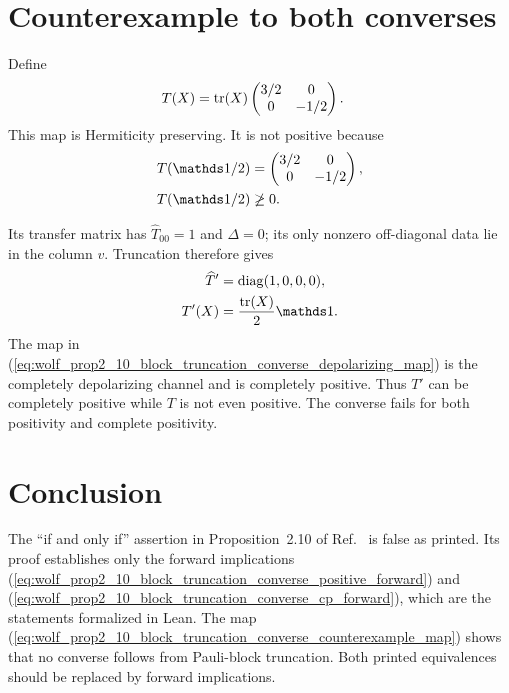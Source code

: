 \documentclass{article}
\begin{document}
\section{Counterexample to both converses}

Define
\begin{align}
    T(X)
        &=\operatorname{tr}(X)
          \begin{pmatrix}
              3/2 & 0\\
              0 & -1/2
          \end{pmatrix}.
    \label{eq:wolf_prop2_10_block_truncation_converse_counterexample_map}
\end{align}
This map is Hermiticity preserving. It is not positive because
\begin{align}
    T(\Id/2)
        &=
          \begin{pmatrix}
              3/2 & 0\\
              0 & -1/2
          \end{pmatrix},
    \label{eq:wolf_prop2_10_block_truncation_converse_negative_output}\\
    T(\Id/2)
        &\not\geq0.
    \label{eq:wolf_prop2_10_block_truncation_converse_not_positive}
\end{align}

Its transfer matrix has $\widehat T_{00}=1$ and $\Delta=0$; its only nonzero
off-diagonal data lie in the column $v$. Truncation therefore gives
\begin{align}
    \widehat T'
        &=\operatorname{diag}(1,0,0,0),
    \label{eq:wolf_prop2_10_block_truncation_converse_depolarizing_transfer}\\
    T'(X)
        &=\frac{\tr(X)}{2}\Id.
    \label{eq:wolf_prop2_10_block_truncation_converse_depolarizing_map}
\end{align}
The map in
(\ref{eq:wolf_prop2_10_block_truncation_converse_depolarizing_map}) is the
completely depolarizing channel and is completely positive. Thus $T'$ can be
completely positive while $T$ is not even positive. The converse fails for
both positivity and complete positivity.

\section{Conclusion}

The ``if and only if'' assertion in Proposition~2.10 of
Ref.~\cite{Wolf2012Quantum} is false as printed. Its proof establishes only
the forward implications
(\ref{eq:wolf_prop2_10_block_truncation_converse_positive_forward}) and
(\ref{eq:wolf_prop2_10_block_truncation_converse_cp_forward}), which are the
statements formalized in Lean. The map
(\ref{eq:wolf_prop2_10_block_truncation_converse_counterexample_map}) shows
that no converse follows from Pauli-block truncation. Both printed
equivalences should be replaced by forward implications.



\end{document}
